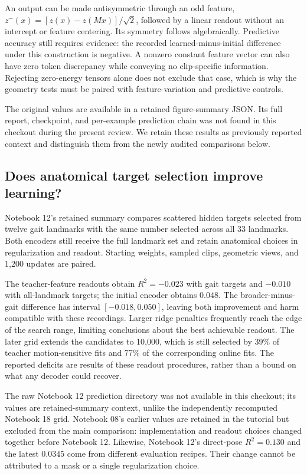 \documentclass{article}
\begin{document}
An output can be made antisymmetric through an odd feature, \(z^-(x)=[z(x)-z(Mx)]/\sqrt{2}\), followed by a linear readout without an intercept or feature centering. Its symmetry follows algebraically. Predictive accuracy still requires evidence: the recorded learned-minus-initial difference under this construction is negative. A nonzero constant feature vector can also have zero token discrepancy while conveying no clip-specific information. Rejecting zero-energy tensors alone does not exclude that case, which is why the geometry tests must be paired with feature-variation and predictive controls.

The original values are available in a retained figure-summary JSON. Its full report, checkpoint, and per-example prediction chain was not found in this checkout during the present review. We retain these results as previously reported context and distinguish them from the newly audited comparisons below.

\subsection{Does anatomical target selection improve learning?}\label{does-anatomical-target-selection-improve-learning}

Notebook 12's retained summary compares scattered hidden targets selected from twelve gait landmarks with the same number selected across all 33 landmarks. Both encoders still receive the full landmark set and retain anatomical choices in regularization and readout. Starting weights, sampled clips, geometric views, and 1,200 updates are paired.

The teacher-feature readouts obtain \(R^2=-0.023\) with gait targets and \(-0.010\) with all-landmark targets; the initial encoder obtains \(0.048\). The broader-minus-gait difference has interval \([-0.018,0.050]\), leaving both improvement and harm compatible with these recordings. Larger ridge penalties frequently reach the edge of the search range, limiting conclusions about the best achievable readout. The later grid extends the candidates to 10,000, which is still selected by 39\% of teacher motion-sensitive fits and 77\% of the corresponding online fits. The reported deficits are results of these readout procedures, rather than a bound on what any decoder could recover.

The raw Notebook 12 prediction directory was not available in this checkout; its values are retained-summary context, unlike the independently recomputed Notebook 18 grid. Notebook 08's earlier values are retained in the tutorial but excluded from the main comparison: implementation and readout choices changed together before Notebook 12. Likewise, Notebook 12's direct-pose \(R^2=0.130\) and the latest \(0.0345\) come from different evaluation recipes. Their change cannot be attributed to a mask or a single regularization choice.
\end{document}
